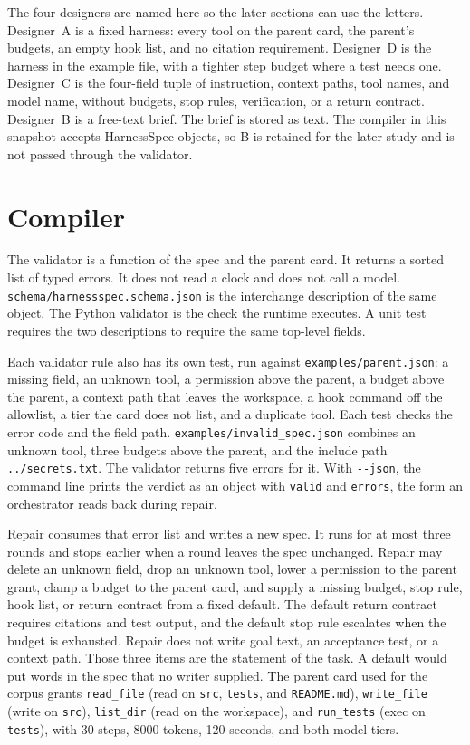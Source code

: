 \documentclass[10pt,a4paper]{article}
\begin{document}
The four designers are named here so the later sections can use the letters. Designer~A is a fixed harness: every tool on the parent card, the parent's budgets, an empty hook list, and no citation requirement. Designer~D is the harness in the example file, with a tighter step budget where a test needs one. Designer~C is the four-field tuple of instruction, context paths, tool names, and model name, without budgets, stop rules, verification, or a return contract. Designer~B is a free-text brief. The brief is stored as text. The compiler in this snapshot accepts HarnessSpec objects, so B is retained for the later study and is not passed through the validator.

\section{Compiler}
\label{sec:compiler}

The validator is a function of the spec and the parent card. It returns a sorted list of typed errors. It does not read a clock and does not call a model. \texttt{schema/harnessspec.schema.json} is the interchange description of the same object. The Python validator is the check the runtime executes. A unit test requires the two descriptions to require the same top-level fields.

Each validator rule also has its own test, run against \texttt{examples/parent.json}: a missing field, an unknown tool, a permission above the parent, a budget above the parent, a context path that leaves the workspace, a hook command off the allowlist, a tier the card does not list, and a duplicate tool. Each test checks the error code and the field path. \texttt{examples/invalid\_spec.json} combines an unknown tool, three budgets above the parent, and the include path \texttt{../secrets.txt}. The validator returns five errors for it. With \texttt{-{}-json}, the command line prints the verdict as an object with \texttt{valid} and \texttt{errors}, the form an orchestrator reads back during repair.

Repair consumes that error list and writes a new spec. It runs for at most three rounds and stops earlier when a round leaves the spec unchanged. Repair may delete an unknown field, drop an unknown tool, lower a permission to the parent grant, clamp a budget to the parent card, and supply a missing budget, stop rule, hook list, or return contract from a fixed default. The default return contract requires citations and test output, and the default stop rule escalates when the budget is exhausted. Repair does not write goal text, an acceptance test, or a context path. Those three items are the statement of the task. A default would put words in the spec that no writer supplied. The parent card used for the corpus grants \texttt{read\_file} (read on \texttt{src}, \texttt{tests}, and \texttt{README.md}), \texttt{write\_file} (write on \texttt{src}), \texttt{list\_dir} (read on the workspace), and \texttt{run\_tests} (exec on \texttt{tests}), with 30 steps, 8000 tokens, 120 seconds, and both model tiers.
\end{document}
